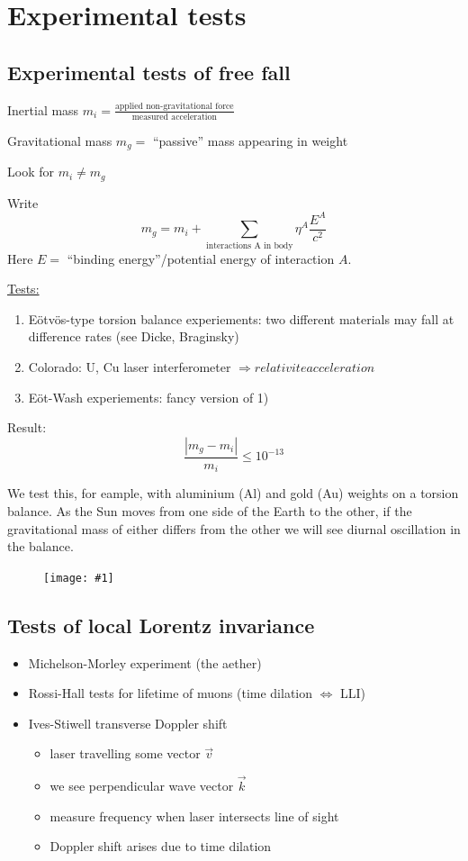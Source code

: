 \documentclass[a4paper]{article} %
\renewcommand{\picture}[1]
{
\begin{figure}[h]
\centering
\texttt{[image: \#1]}
\end{figure}
}
\begin{document}
\section{Experimental tests}
\subsection{Experimental tests of free fall}
Inertial mass $m_i=\frac{\text{applied non-gravitational force}}{\text{measured acceleration}}$

Gravitational mass $m_g=$ ``passive'' mass appearing in weight

Look for $m_i \neq m_g$

Write 
\begin{equation}
m_g=m_i + \sum_{\text{interactions A in body}}\eta^A \frac{E^A}{c^2}
\end{equation} 
Here $E=$ ``binding energy''/potential energy of interaction $A$.

\underline{Tests:}
\begin{enumerate}
\item E{\"o}tv{\"o}s-type torsion balance experiements: two different materials may fall at difference rates (see Dicke, Braginsky)
\item Colorado: U, Cu laser interferometer $\Rightarrow relativite acceleration$
\item E{\"o}t-Wash experiements: fancy version of 1)
\end{enumerate}

Result:
\begin{equation}
\frac{|m_g-m_i|}{m_i}\leq 10^{-13}
\end{equation}

We test this, for eample, with aluminium (Al) and gold (Au) weights on a torsion balance. As the Sun moves from one side of the Earth to the other, if the gravitational mass of either differs from the other we will see diurnal oscillation in the balance.

\picture{images/eotvos.png}

\subsection{Tests of local Lorentz invariance}
\begin{itemize}
\item Michelson-Morley experiment (the aether)
\item Rossi-Hall tests for lifetime of muons (time dilation $\Leftrightarrow$ LLI)
\item Ives-Stiwell transverse Doppler shift
\begin{itemize}
\item laser travelling some vector $\vec{v}$
\item we see perpendicular wave vector $\vec{k}$
\item measure frequency when laser intersects line of sight
\item Doppler shift arises due to time dilation
\end{itemize}
\end{itemize}
\end{document}
